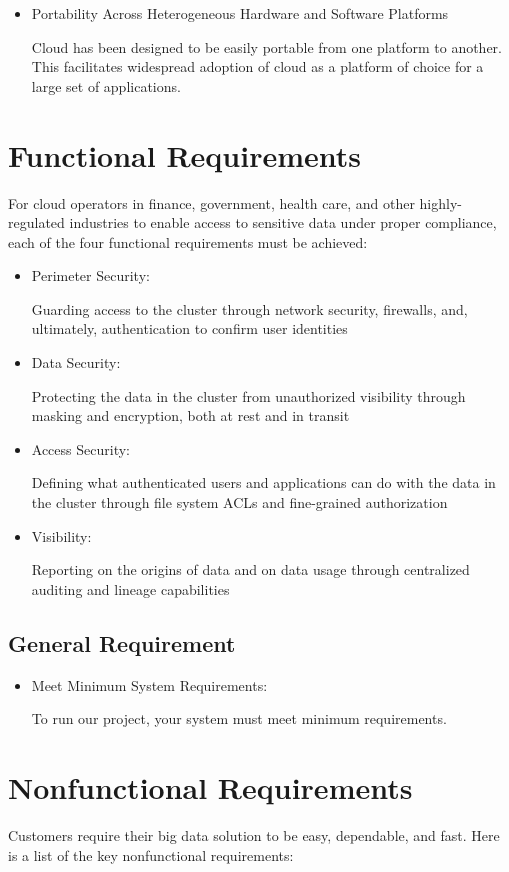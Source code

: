 \documentclass[oneside,a4paper,12pt]{book}
\begin{document}
\begin{itemize}
  \item Portability Across Heterogeneous Hardware and Software Platforms
  \par Cloud has been designed to be easily portable from one platform to another. This facilitates widespread adoption of cloud as a platform of choice for a large set of applications.
\end{itemize}
\section{Functional Requirements}
For cloud operators in finance, government, health care, and other highly-regulated industries to enable access to sensitive data under proper compliance, each of the four functional requirements must be achieved:
\begin{itemize}
    \item Perimeter Security: 
    \par Guarding access to the cluster through network security, firewalls, and, ultimately, authentication to confirm user identities
    \item Data Security:
    \par Protecting the data in the cluster from unauthorized visibility through masking and encryption, both at rest and in transit
    \item Access Security:
    \par Defining what authenticated users and applications can do with the data in the cluster through file system ACLs and fine-grained authorization
    \item Visibility: 
    \par Reporting on the origins of data and on data usage through centralized auditing and lineage capabilities
    \end{itemize}
\subsection{General Requirement}    
\begin{itemize}
    \item Meet Minimum System Requirements:
    \par To run our project, your system must meet minimum requirements.
\end{itemize}
\section{Nonfunctional Requirements}
Customers require their big data solution to be easy, dependable, and fast. Here is a list of the key nonfunctional requirements:
\end{document}
